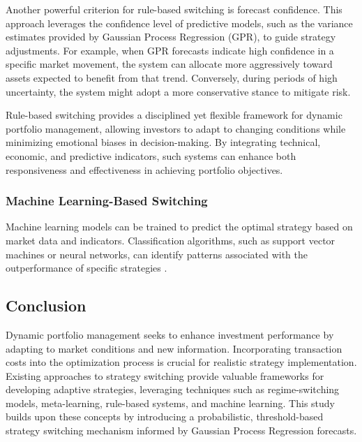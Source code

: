 Another powerful criterion for rule-based switching is forecast confidence. This approach leverages the confidence level of predictive models, such as the variance estimates provided by Gaussian Process Regression (GPR), to guide strategy adjustments. For example, when \ac{GPR} forecasts indicate high confidence in a specific market movement, the system can allocate more aggressively toward assets expected to benefit from that trend. Conversely, during periods of high uncertainty, the system might adopt a more conservative stance to mitigate risk.

Rule-based switching provides a disciplined yet flexible framework for dynamic portfolio management, allowing investors to adapt to changing conditions while minimizing emotional biases in decision-making. By integrating technical, economic, and predictive indicators, such systems can enhance both responsiveness and effectiveness in achieving portfolio objectives.


\subsubsection{Machine Learning-Based Switching}

Machine learning models can be trained to predict the optimal strategy based on market data and indicators. Classification algorithms, such as support vector machines or neural networks, can identify patterns associated with the outperformance of specific strategies \cite{fernandez2018machine}.

\subsection{Conclusion}

Dynamic portfolio management seeks to enhance investment performance by adapting to market conditions and new information. Incorporating transaction costs into the optimization process is crucial for realistic strategy implementation. Existing approaches to strategy switching provide valuable frameworks for developing adaptive strategies, leveraging techniques such as regime-switching models, meta-learning, rule-based systems, and machine learning. This study builds upon these concepts by introducing a probabilistic, threshold-based strategy switching mechanism informed by Gaussian Process Regression forecasts.




